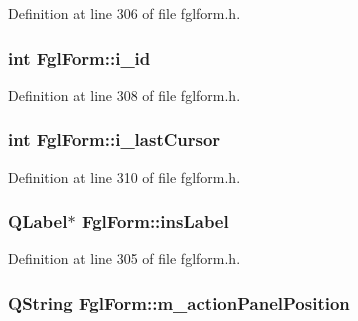 Definition at line 306 of file fglform.h.

\hypertarget{classFglForm_a6142cd4363f16562e52631f1987b46c3}{
\subsubsection[{i\_\-id}]{\setlength{\rightskip}{0pt plus 5cm}int {\bf FglForm::i\_\-id}}}
\label{classFglForm_a6142cd4363f16562e52631f1987b46c3}


Definition at line 308 of file fglform.h.

\hypertarget{classFglForm_a9f622b4a17fcad8c785e119d19abe326}{
\subsubsection[{i\_\-lastCursor}]{\setlength{\rightskip}{0pt plus 5cm}int {\bf FglForm::i\_\-lastCursor}}}
\label{classFglForm_a9f622b4a17fcad8c785e119d19abe326}


Definition at line 310 of file fglform.h.

\hypertarget{classFglForm_a72467aa7c8750f7075b7ba7fc67a29bb}{
\subsubsection[{insLabel}]{\setlength{\rightskip}{0pt plus 5cm}QLabel$\ast$ {\bf FglForm::insLabel}}}
\label{classFglForm_a72467aa7c8750f7075b7ba7fc67a29bb}


Definition at line 305 of file fglform.h.

\hypertarget{classFglForm_af3882d981d23db8e6dca26a44ac23051}{
\subsubsection[{m\_\-actionPanelPosition}]{\setlength{\rightskip}{0pt plus 5cm}QString {\bf FglForm::m\_\-actionPanelPosition}}}
\label{classFglForm_af3882d981d23db8e6dca26a44ac23051}


